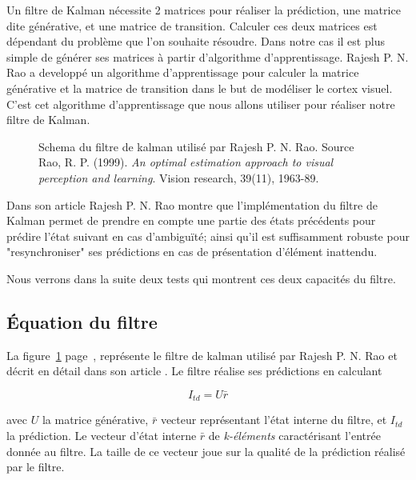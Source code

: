 Un filtre de Kalman nécessite 2 matrices pour réaliser la prédiction, une
matrice dite générative, et une matrice de transition\cite{Rao1999}. Calculer
ces deux matrices est dépendant du problème que l'on souhaite résoudre. Dans
notre cas il est plus simple de générer ses matrices à partir d'algorithme
d'apprentissage. Rajesh P. N. Rao a developpé un algorithme d'apprentissage
pour calculer la matrice générative et la matrice de transition dans le but de
modéliser le cortex visuel\cite{Rao1999}. C'est cet algorithme d'apprentissage
que nous allons utiliser pour réaliser notre filtre de Kalman.

\begin{figure}[ht]
   \begin{center}
   \end{center}
   \caption[Schema du filtre de kalman]{Schema du filtre de kalman utilisé par
   Rajesh P. N. Rao. Source Rao, R. P. (1999). \textit{An optimal estimation
   approach to visual perception and learning}. Vision research, 39(11),
   1963-89. \cite{Rao1999}}
   \label{fig:filtre_kalman}
\end{figure}

Dans son article\cite{Rao1999} Rajesh P. N. Rao montre que l'implémentation du
filtre de Kalman permet de prendre en compte une partie des états précédents
pour prédire l'état suivant en cas d'ambiguïté; ainsi qu'il est suffisamment
robuste pour "resynchroniser" ses prédictions en cas de présentation d'élément
inattendu.

Nous verrons dans la suite deux tests qui montrent ces deux capacités du filtre.

\subsection{Équation du filtre} %
\label{sub:Équation du filtre}

La figure~\ref{fig:filtre_kalman} page~\pageref{fig:filtre_kalman}, représente
le filtre de kalman utilisé par Rajesh P. N. Rao et décrit en détail dans son
article \cite{Rao1999}. Le filtre réalise ses prédictions en calculant

\[ I_{td} = U\bar{r} \]

avec $U$ la matrice générative, $\bar{r}$ vecteur représentant l'état interne
du filtre, et $I_{td}$ la prédiction. Le vecteur d'état interne $\bar{r}$ de
\textit{k-éléments} caractérisant l'entrée donnée au filtre. La taille de ce
vecteur joue sur la qualité de la prédiction réalisé par le filtre.

